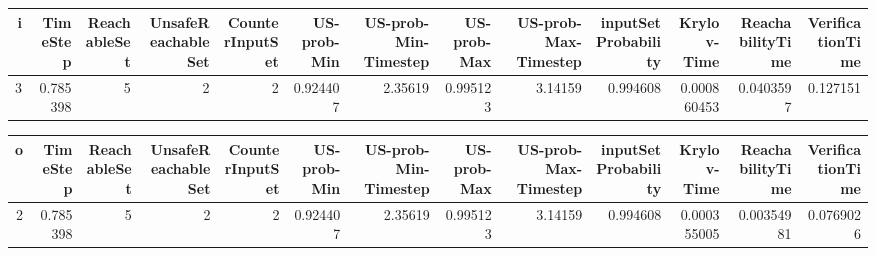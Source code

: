 \begin{tabular}{rrrrrrrrrrrrr}
\hline
   i &   TimeStep &   ReachableSet &   UnsafeReachableSet &   CounterInputSet &   US-prob-Min &   US-prob-Min-Timestep &   US-prob-Max &   US-prob-Max-Timestep &   inputSet Probability &   Krylov-Time &   ReachabilityTime &   VerificationTime \\
\hline
   3 &   0.785398 &              5 &                    2 &                 2 &      0.924407 &                2.35619 &      0.995123 &                3.14159 &               0.994608 &   0.000860453 &          0.0403597 &           0.127151 \\
\hline
\end{tabular}
\begin{tabular}{rrrrrrrrrrrrr}
\hline
   o &   TimeStep &   ReachableSet &   UnsafeReachableSet &   CounterInputSet &   US-prob-Min &   US-prob-Min-Timestep &   US-prob-Max &   US-prob-Max-Timestep &   inputSet Probability &   Krylov-Time &   ReachabilityTime &   VerificationTime \\
\hline
   2 &   0.785398 &              5 &                    2 &                 2 &      0.924407 &                2.35619 &      0.995123 &                3.14159 &               0.994608 &   0.000355005 &         0.00354981 &          0.0769026 \\
\hline
\end{tabular}


